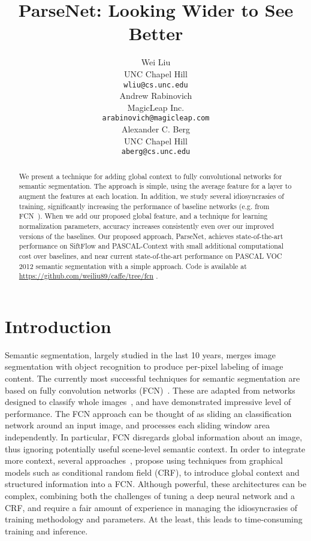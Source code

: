 \documentclass{article} \usepackage{iclr2016_conference}
\title{ParseNet: Looking Wider to See Better}
\author{Wei Liu\\
UNC Chapel Hill\\
\texttt{wliu@cs.unc.edu} \\
\And
Andrew Rabinovich\\
MagicLeap Inc.\\
\texttt{arabinovich@magicleap.com} \\
\And
Alexander C. Berg\\
UNC Chapel Hill\\
\texttt{aberg@cs.unc.edu}
}
\begin{document}
\maketitle

\begin{abstract}
We present a technique for adding global context to fully convolutional networks for semantic segmentation. The approach is simple, using the average feature for a layer to augment the features at each location. In addition, we study several idiosyncrasies of training, significantly increasing the performance of baseline networks (e.g. from FCN~\cite{long2014fully}). When we add our proposed global feature, and a technique for learning normalization parameters, accuracy increases consistently even over our improved versions of the baselines. Our proposed approach, ParseNet, achieves state-of-the-art performance on SiftFlow and PASCAL-Context with small additional computational cost over baselines, and near current state-of-the-art performance on PASCAL VOC 2012 semantic segmentation with a simple approach. Code is available at \url{https://github.com/weiliu89/caffe/tree/fcn} .
\end{abstract}

\section{Introduction}
Semantic segmentation, largely studied in the last 10 years, merges image segmentation with object recognition to produce per-pixel labeling of image content. The currently most successful techniques for semantic segmentation are based on fully convolution networks (FCN)~\cite{long2014fully}. These are adapted from networks designed to classify whole images~\cite{krizhevsky2012imagenet,szegedy2014going,simonyan2014very}, and have demonstrated impressive level of performance. The FCN approach can be thought of as sliding an classification network around an input image, and processes each sliding window area independently. In particular, FCN disregards global information about an image, thus ignoring potentially useful scene-level semantic context. In order to integrate more context, several approaches~\cite{chen2014semantic, schwing2015fully, lin2015efficient, zheng2015conditional}, propose using techniques from graphical models such as conditional random field (CRF), to introduce global context and structured information into a FCN. Although powerful, these architectures can be complex, combining both the challenges of tuning a deep neural network and a CRF, and require a fair amount of experience in managing the idiosyncrasies of training methodology and parameters. At the least, this leads to time-consuming training and inference.
\end{document}
